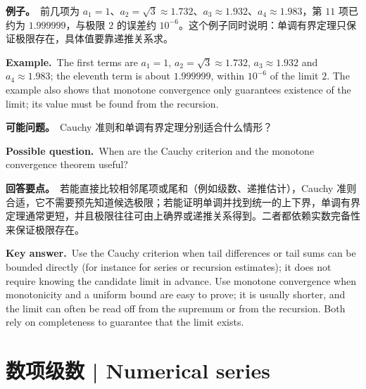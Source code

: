 \documentclass[UTF8,11pt,a4paper]{ctexart}
\newcommand{\EX}[2]{\par\noindent\textbf{例子。}\ #1\par\noindent\textbf{Example.}\ #2\par}
\newcommand{\ASK}[4]{\begin{samepage}\par\noindent\textbf{可能问题。}\ #1\par\noindent\textbf{Possible question.}\ #2\par\noindent\textbf{回答要点。}\ #3\par\noindent\textbf{Key answer.}\ #4\medskip\end{samepage}}
\begin{document}
\EX{前几项为 $a_1=1$、$a_2=\sqrt3\approx1.732$、$a_3\approx1.932$、$a_4\approx1.983$，第 $11$ 项已约为 $1.999999$，与极限 $2$ 的误差约 $10^{-6}$。这个例子同时说明：单调有界定理只保证极限存在，具体值要靠递推关系求。}{The first terms are $a_1=1$, $a_2=\sqrt3\approx1.732$, $a_3\approx1.932$ and $a_4\approx1.983$; the eleventh term is about $1.999999$, within $10^{-6}$ of the limit $2$. The example also shows that monotone convergence only guarantees existence of the limit; its value must be found from the recursion.}
\ASK{Cauchy 准则和单调有界定理分别适合什么情形？}{When are the Cauchy criterion and the monotone convergence theorem useful?}{若能直接比较相邻尾项或尾和（例如级数、递推估计），Cauchy 准则合适，它不需要预先知道候选极限；若能证明单调并找到统一的上下界，单调有界定理通常更短，并且极限往往可由上确界或递推关系得到。二者都依赖实数完备性来保证极限存在。}{Use the Cauchy criterion when tail differences or tail sums can be bounded directly (for instance for series or recursion estimates); it does not require knowing the candidate limit in advance. Use monotone convergence when monotonicity and a uniform bound are easy to prove; it is usually shorter, and the limit can often be read off from the supremum or from the recursion. Both rely on completeness to guarantee that the limit exists.}

\setcounter{section}{5}
\section{数项级数 | Numerical series}
\end{document}
